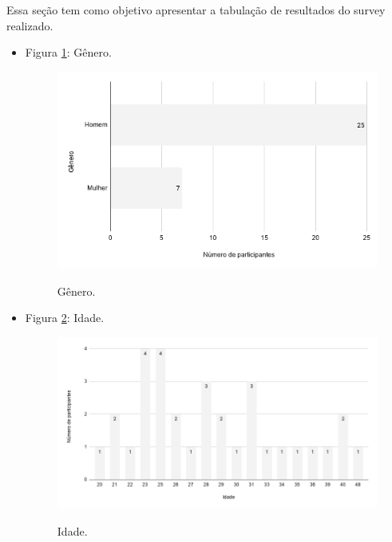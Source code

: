 \label{sec:resultadospesquisa}


Essa seção tem como objetivo apresentar a tabulação de resultados do survey realizado.

\begin{itemize}


    \item Figura \ref{figure:s_genero}: Gênero.
        \begin{figure}[!htb]
        \centering
        \includegraphics[width=.80\textwidth]{images/s_genero.png}
        \label{figure:s_genero}
        \caption{Gênero.}
        \end{figure}
    
    
    \item Figura \ref{figure:s_idade}: Idade.
        \begin{figure}[!htb]
        \centering
        \includegraphics[width=.80\textwidth]{images/s_idade.png}
        \label{figure:s_idade}
        \caption{Idade.}
        \end{figure}
    

\end{itemize}
